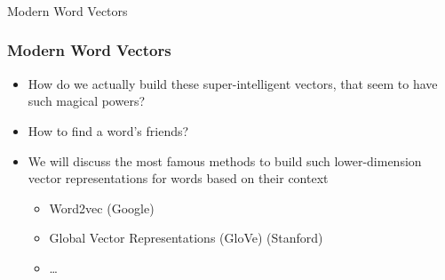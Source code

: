 



\begin{frame}[fragile]\frametitle{}

\begin{center}
{\Large Modern Word Vectors}
\end{center}
\end{frame}




\begin{frame}[fragile]\frametitle{Modern Word Vectors}
\begin{itemize}
\item How do we actually build these super-intelligent vectors, that seem to have such magical powers?
\item How to find a word's friends?
\item We will discuss the most famous methods to build such lower-dimension vector representations for words based on their context
\begin{itemize}
\item Word2vec  (Google)
\item Global Vector Representations (GloVe)   (Stanford)
\item \ldots
\end{itemize}
\end{itemize}
\end{frame}



